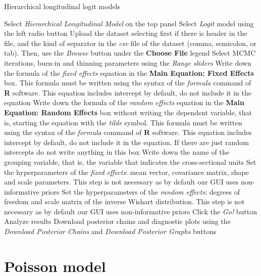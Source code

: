 \begin{algorithm}[h!]
	\caption{Hierarchical longitudinal logit models}\label{alg:HLogit}
	\begin{algorithmic}[1]  		 			
		\State Select \textit{Hierarchical Longitudinal Model} on the top panel
		\State Select \textit{Logit} model using the left radio button
		\State Upload the dataset selecting first if there is header in the file, and the kind of separator in the \textit{csv} file of the dataset (comma, semicolon, or tab). Then, use the \textit{Browse} button under the \textbf{Choose File} legend
		\State Select MCMC iterations, burn-in and thinning parameters using the \textit{Range sliders}
		\State Write down the formula of the \textit{fixed effects} equation in the \textbf{Main Equation: Fixed Effects} box. This formula must be written using the syntax of the \textit{formula} command of \textbf{R} software. This equation includes intercept by default, do not include it in the equation
		\State Write down the formula of the \textit{random effects} equation in the \textbf{Main Equation: Random Effects} box without writing the dependent variable, that is, starting the equation with the \textit{tilde} symbol. This formula must be written using the syntax of the \textit{formula} command of \textbf{R} software. This equation includes intercept by default, do not include it in the equation. If there are just random intercepts do not write anything in this box
		\State Write down the name of the grouping variable, that is, the variable that indicates the cross-sectional units 
		\State Set the hyperparameters of the \textit{fixed effects}: mean vector, covariance matrix, shape and scale parameters. This step is not necessary as by default our GUI uses non-informative priors
		\State Set the hyperparameters of the \textit{random effects}: degrees of freedom and scale matrix of the inverse Wishart distribution. This step is not necessary as by default our GUI uses non-informative priors
		\State Click the \textit{Go!} button
		\State Analyze results
		\State Download posterior chains and diagnostic plots using the \textit{Download Posterior Chains} and \textit{Download Posterior Graphs} buttons
	\end{algorithmic} 
\end{algorithm}


\section{Poisson model}\label{sec93}

